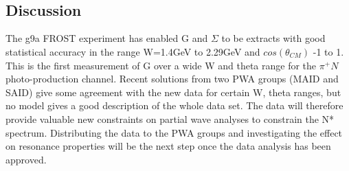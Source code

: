 \begin{figure}[H]
\ContinuedFloat
  \begin{center} 
     \\
     \\
  \end{center}
\end{figure}




\subsection{Discussion}

The g9a FROST experiment has enabled G and $\Sigma$ to be extracts with good statistical accuracy in the range W=1.4GeV to 2.29GeV and $cos(\theta_{CM})$ -1 to 1.  This is the first measurement of G over a wide W and theta range for the $\pi^+ N$ photo-production channel. Recent solutions from two PWA groups (MAID and SAID) give some agreement with the new data for certain W, theta ranges, but no model gives a good description of the whole data set.  The data will therefore provide valuable new constraints on partial wave analyses to constrain the N* spectrum. Distributing the data to the PWA groups and investigating the effect on resonance properties will be the next step once the data analysis has been approved. 
